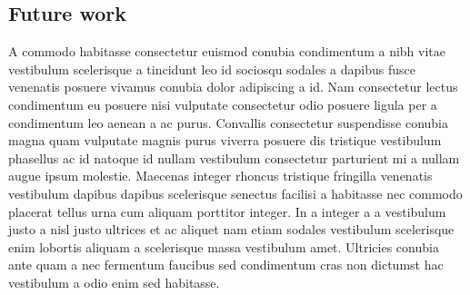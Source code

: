 \subsection{Future work}

A commodo habitasse consectetur euismod conubia condimentum a nibh vitae vestibulum scelerisque a tincidunt leo id sociosqu sodales a dapibus fusce venenatis posuere vivamus conubia dolor adipiscing a id. Nam consectetur lectus condimentum eu posuere nisi vulputate consectetur odio posuere ligula per a condimentum leo aenean a ac purus. Convallis consectetur suspendisse conubia magna quam vulputate magnis purus viverra posuere dis tristique vestibulum phasellus ac id natoque id nullam vestibulum consectetur parturient mi a nullam augue ipsum molestie. Maecenas integer rhoncus tristique fringilla venenatis vestibulum dapibus dapibus scelerisque senectus facilisi a habitasse nec commodo placerat tellus urna cum aliquam porttitor integer. In a integer a a vestibulum justo a nisl justo ultrices et ac aliquet nam etiam sodales vestibulum scelerisque enim lobortis aliquam a scelerisque massa vestibulum amet. Ultricies conubia ante quam a nec fermentum faucibus sed condimentum cras non dictumst hac vestibulum a odio enim sed habitasse.